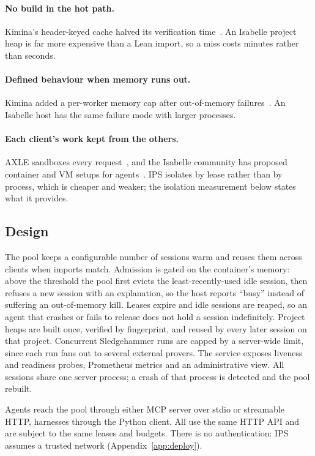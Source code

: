 \documentclass[11pt]{article}
\begin{document}
\paragraph{No build in the hot path.} Kimina's header-keyed cache halved
its verification time~\cite{santos2025kimina}. An Isabelle project heap
is far more expensive than a Lean import, so a miss costs minutes rather
than seconds.

\paragraph{Defined behaviour when memory runs out.} Kimina added a
per-worker memory cap after out-of-memory
failures~\cite{santos2025kimina}. An Isabelle host has the same failure
mode with larger processes.

\paragraph{Each client's work kept from the others.} AXLE sandboxes every
request~\cite{xin2026axle}, and the Isabelle community has proposed
container and VM setups for agents~\cite{schaeffeler2026safe}. IPS
isolates by lease rather than by process, which is cheaper and weaker;
the isolation measurement below states what it provides.

\subsection{Design}

The pool keeps a configurable number of sessions warm and reuses them
across clients when imports match. Admission is gated on the container's
memory: above the threshold the pool first evicts the least-recently-used
idle session, then refuses a new session with an explanation, so the host
reports ``busy'' instead of suffering an out-of-memory kill. Leases expire
and idle sessions are reaped, so an agent that crashes or fails to release
does not hold a session indefinitely. Project heaps are built once,
verified by fingerprint, and reused by every later session on that
project. Concurrent Sledgehammer runs are capped by a server-wide limit,
since each run fans out to several external provers. The service exposes
liveness and readiness probes, Prometheus metrics and an administrative
view. All sessions share one server process; a crash of that process is
detected and the pool rebuilt.

Agents reach the pool through either MCP server over stdio or streamable
HTTP, harnesses through the Python client. All use the same HTTP API and
are subject to the same leases and budgets. There is no authentication:
IPS assumes a trusted network (Appendix~\ref{app:deploy}).
\end{document}
